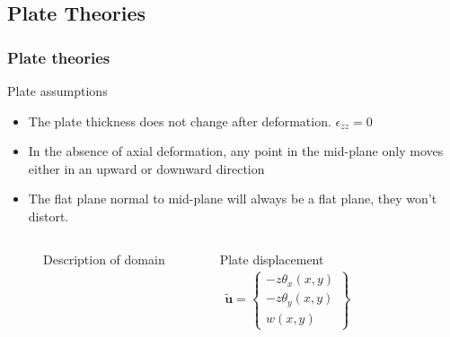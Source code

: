 \documentclass[9pt]{beamer}
\begin{document}
\subsection{Plate Theories}
\begin{frame}
\frametitle{Plate theories}

\begin{block}{Plate assumptions}
\begin{itemize}
\item The plate thickness does not change after deformation.  $\epsilon_{zz} = 0$ 

\item  In the absence of axial deformation, any point in the mid-plane only moves either in an upward or downward direction

\item  The flat plane normal to mid-plane will always be a flat plane, they won't distort. 
\end{itemize}
\end{block}
\begin{columns}
\begin{figure}[ht!]
\centering
\caption{Description of domain}
\label{fig:Domain}
\end{figure}
\begin{block}{Plate displacement}
\begin{equation*}
 \begin{split}
\tilde{\mathbf{u}} =
\left\{
\begin{array}{r}
 - z \theta_x \left(x,y\right) \\
 - z \theta_y \left(x,y\right)\\
  w \left(x, y \right) 
\end{array} \right\}
\end{split}
\end{equation*}
\end{block}

\end{columns}
\end{frame}
\end{document}

